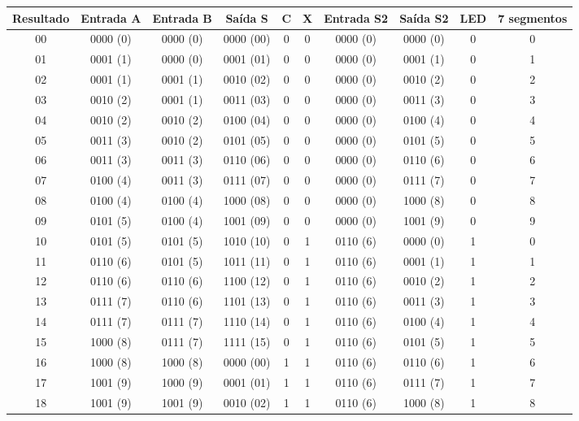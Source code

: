 \documentclass[11pt]{report}         %
\begin{document}
\begin{itemize}
\begin{table}[h!]
\begin{tabular}{|>{\columncolor{black}\color{white}}c|c|c|c|c|c|c|c|c|c|}
      \hline
      \textbf{Resultado} & \textbf{Entrada A} & \textbf{Entrada B} & \textbf{Saída S} & \textbf{C} & \textbf{X} & \textbf{Entrada S2} & \textbf{Saída S2} & \textbf{LED} & \textbf{7 segmentos}\\ \hline
      00 & 0000 (0) & 0000 (0) & 0000 (00) & 0 & 0 & 0000 (0) & 0000 (0) & 0 & 0 \\ \hline
      01 & 0001 (1) & 0000 (0) & 0001 (01) & 0 & 0 & 0000 (0) & 0001 (1) & 0 & 1 \\ \hline
      02 & 0001 (1) & 0001 (1) & 0010 (02) & 0 & 0 & 0000 (0) & 0010 (2) & 0 & 2 \\ \hline
      03 & 0010 (2) & 0001 (1) & 0011 (03) & 0 & 0 & 0000 (0) & 0011 (3) & 0 & 3 \\ \hline
      04 & 0010 (2) & 0010 (2) & 0100 (04) & 0 & 0 & 0000 (0) & 0100 (4) & 0 & 4 \\ \hline
      05 & 0011 (3) & 0010 (2) & 0101 (05) & 0 & 0 & 0000 (0) & 0101 (5) & 0 & 5 \\ \hline
      06 & 0011 (3) & 0011 (3) & 0110 (06) & 0 & 0 & 0000 (0) & 0110 (6) & 0 & 6 \\ \hline
      07 & 0100 (4) & 0011 (3) & 0111 (07) & 0 & 0 & 0000 (0) & 0111 (7) & 0 & 7 \\ \hline
      08 & 0100 (4) & 0100 (4) & 1000 (08) & 0 & 0 & 0000 (0) & 1000 (8) & 0 & 8 \\ \hline
      09 & 0101 (5) & 0100 (4) & 1001 (09) & 0 & 0 & 0000 (0) & 1001 (9) & 0 & 9 \\ \hline
      10 & 0101 (5) & 0101 (5) & 1010 (10) & 0 & 1 & 0110 (6) & 0000 (0) & 1 & 0 \\ \hline
      11 & 0110 (6) & 0101 (5) & 1011 (11) & 0 & 1 & 0110 (6) & 0001 (1) & 1 & 1 \\ \hline
      12 & 0110 (6) & 0110 (6) & 1100 (12) & 0 & 1 & 0110 (6) & 0010 (2) & 1 & 2 \\ \hline
      13 & 0111 (7) & 0110 (6) & 1101 (13) & 0 & 1 & 0110 (6) & 0011 (3) & 1 & 3 \\ \hline
      14 & 0111 (7) & 0111 (7) & 1110 (14) & 0 & 1 & 0110 (6) & 0100 (4) & 1 & 4 \\ \hline
      15 & 1000 (8) & 0111 (7) & 1111 (15) & 0 & 1 & 0110 (6) & 0101 (5) & 1 & 5 \\ \hline
      16 & 1000 (8) & 1000 (8) & 0000 (00) & 1 & 1 & 0110 (6) & 0110 (6) & 1 & 6 \\ \hline
      17 & 1001 (9) & 1000 (9) & 0001 (01) & 1 & 1 & 0110 (6) & 0111 (7) & 1 & 7 \\ \hline
      18 & 1001 (9) & 1001 (9) & 0010 (02) & 1 & 1 & 0110 (6) & 1000 (8) & 1 & 8 \\ \hline


\end{tabular}
\end{table}
\end{itemize}
\end{document}
